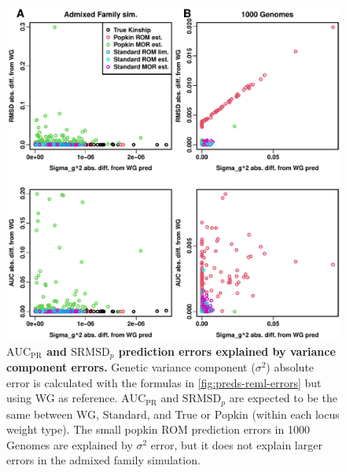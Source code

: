 \documentclass[11pt]{article}
\newcommand{\rmsd}{\text{SRMSD}_p}
\newcommand{\auc}{\text{AUC}_\text{PR}}
\begin{document}
\begin{figure}[bp!]
  \centering
  \includegraphics[width=\textwidth]{reml-err-vs-pred-err.pdf}
  \caption{
    {\bf $\auc$ and $\rmsd$ prediction errors explained by variance component errors.}
    Genetic variance component ($\sigma^2$) absolute error is calculated with the formulas in \cref{fig:preds-reml-errors} but using WG as reference.
    $\auc$ and $\rmsd$ are expected to be the same between WG, Standard, and True or Popkin (within each locus weight type).
    The small popkin ROM prediction errors in 1000 Genomes are explained by $\sigma^2$ error, but it does not explain larger errors in the admixed family simulation.
  }
  \label{fig:reml-err-vs-pred-err}
\end{figure}
\end{document}
